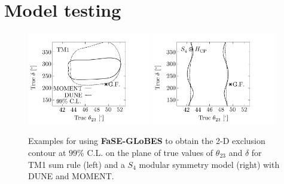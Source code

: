 \documentclass[aps,prd,nofootinbib,preprint]{revtex4}
\begin{document}
\section{Model testing}
\begin{figure}[!h]
 \centering
\includegraphics[width=0.48\textwidth]{Figs/TM1_th23_dCP.pdf}
\includegraphics[width=0.48\textwidth]{Figs/OP_th23_dCP.pdf}
\caption{\label{fig:th23_delta}Examples for using \textbf{FaSE-GLoBES} to obtain the 2-D exclusion contour at $99\%$ C.L. on the plane of true values of $\theta_{23}$ and $\delta$ for TM1 sum rule (left) and a $S_4$ modular symmetry model (right) with DUNE and MOMENT. }
\end{figure}
\end{document}
